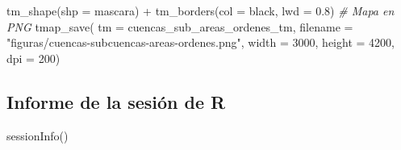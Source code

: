 \documentclass[spanish]{article}
\newenvironment{Shaded}{\begin{snugshade}}{\end{snugshade}}
\newcommand{\AttributeTok}[1]{\textcolor[rgb]{0.77,0.63,0.00}{#1}}
\newcommand{\CommentTok}[1]{\textcolor[rgb]{0.56,0.35,0.01}{\textit{#1}}}
\newcommand{\DecValTok}[1]{\textcolor[rgb]{0.00,0.00,0.81}{#1}}
\newcommand{\FloatTok}[1]{\textcolor[rgb]{0.00,0.00,0.81}{#1}}
\newcommand{\FunctionTok}[1]{\textcolor[rgb]{0.00,0.00,0.00}{#1}}
\newcommand{\NormalTok}[1]{#1}
\newcommand{\SpecialCharTok}[1]{\textcolor[rgb]{0.00,0.00,0.00}{#1}}
\newcommand{\StringTok}[1]{\textcolor[rgb]{0.31,0.60,0.02}{#1}}
\begin{document}
\begin{Shaded}
\begin{Highlighting}[]
  \FunctionTok{tm\_shape}\NormalTok{(}\AttributeTok{shp =}\NormalTok{ mascara) }\SpecialCharTok{+}
  \FunctionTok{tm\_borders}\NormalTok{(}\AttributeTok{col =} \StringTok{\textquotesingle{}black\textquotesingle{}}\NormalTok{, }\AttributeTok{lwd =} \FloatTok{0.8}\NormalTok{)}
\CommentTok{\# Mapa en PNG}
\FunctionTok{tmap\_save}\NormalTok{(}
  \AttributeTok{tm =}\NormalTok{ cuencas\_sub\_areas\_ordenes\_tm,}
  \AttributeTok{filename =} \StringTok{"figuras/cuencas{-}subcuencas{-}areas{-}ordenes.png"}\NormalTok{,}
  \AttributeTok{width =} \DecValTok{3000}\NormalTok{, }\AttributeTok{height =} \DecValTok{4200}\NormalTok{, }\AttributeTok{dpi =} \DecValTok{200}\NormalTok{)}
\end{Highlighting}
\end{Shaded}

\hypertarget{informe-de-la-sesiuxf3n-de-r}{%
\subsection*{Informe de la sesión de
R}\label{informe-de-la-sesiuxf3n-de-r}}

\begin{Shaded}
\begin{Highlighting}[]
\FunctionTok{sessionInfo}\NormalTok{()}
\end{Highlighting}
\end{Shaded}
\end{document}
